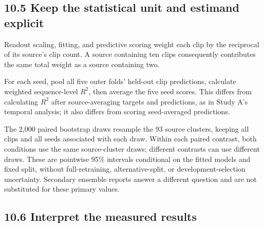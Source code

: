 \documentclass[11pt,letterpaper]{article}
\begin{document}
\subsection{10.5 Keep the statistical unit and estimand
explicit}\label{keep-the-statistical-unit-and-estimand-explicit}

Readout scaling, fitting, and predictive scoring weight each clip by the
reciprocal of its source's clip count. A source containing ten clips
consequently contributes the same total weight as a source containing
two.

For each seed, pool all five outer folds' held-out clip predictions,
calculate weighted sequence-level \(R^2\), then average the five seed
scores. This differs from calculating \(R^2\) after source-averaging
targets and predictions, as in Study A's temporal analysis; it also
differs from scoring seed-averaged predictions.

The 2,000 paired bootstrap draws resample the 93 source clusters,
keeping all clips and all seeds associated with each draw. Within each
paired contrast, both conditions use the same source-cluster draws;
different contrasts can use different draws. These are pointwise 95\%
intervals conditional on the fitted models and fixed split, without
full-retraining, alternative-split, or development-selection
uncertainty. Secondary ensemble reports answer a different question and
are not substituted for these primary values.

\subsection{10.6 Interpret the measured
results}\label{interpret-the-measured-results}
\end{document}
